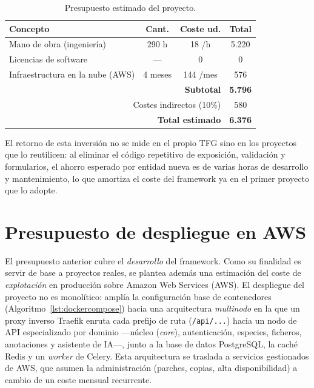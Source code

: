 \begin{table}[!htbp]
\caption{Presupuesto estimado del proyecto.}
\label{tab:presu}
\centering
\begin{tabular}{|p{7cm}|c|c|c|}
\hline
\textbf{Concepto} & \textbf{Cant.} & \textbf{Coste ud.} & \textbf{Total} \\ \hline
Mano de obra (ingeniería) & 290 h & 18 \texteuro{}/h & 5.220 \texteuro{} \\ \hline
Licencias de software & --- & 0 \texteuro{} & 0 \texteuro{} \\ \hline
Infraestructura en la nube (AWS) & 4 meses & 144 \texteuro{}/mes & 576 \texteuro{} \\ \hline
\multicolumn{3}{|r|}{\textbf{Subtotal}} & \textbf{5.796 \texteuro{}} \\ \hline
\multicolumn{3}{|r|}{Costes indirectos (10\%)} & 580 \texteuro{} \\ \hline
\multicolumn{3}{|r|}{\textbf{Total estimado}} & \textbf{6.376 \texteuro{}} \\ \hline
\end{tabular}
\end{table}

El retorno de esta inversión no se mide en el propio TFG sino en los proyectos
que lo reutilicen: al eliminar el código repetitivo de exposición, validación
y formularios, el ahorro esperado por entidad nueva es de varias horas de
desarrollo y mantenimiento, lo que amortiza el coste del framework ya en el
primer proyecto que lo adopte.

\section{Presupuesto de despliegue en AWS}
El presupuesto anterior cubre el \emph{desarrollo} del framework. Como su
finalidad es servir de base a proyectos reales, se plantea además una
estimación del coste de \emph{explotación} en producción sobre Amazon Web
Services (AWS). El despliegue del proyecto no es monolítico: amplía la
configuración base de contenedores (Algoritmo~\ref{lst:dockercompose}) hacia una
arquitectura \emph{multinodo} en la que un proxy inverso Traefik enruta cada
prefijo de ruta (\texttt{/api/...}) hacia un nodo de API especializado por
dominio ---núcleo (\emph{core}), autenticación, especies, ficheros, anotaciones
y asistente de IA---, junto a la base de datos PostgreSQL, la caché Redis y un
\emph{worker} de Celery. Esta arquitectura se traslada a servicios gestionados
de AWS, que asumen la administración (parches, copias, alta disponibilidad) a
cambio de un coste mensual recurrente.

